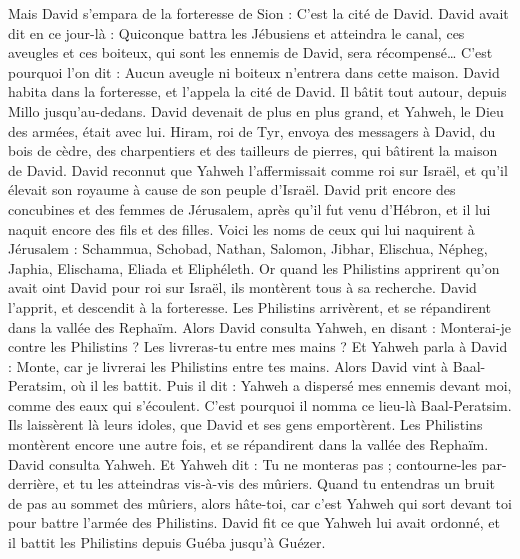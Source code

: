 \begin{multicols}{2}
Mais David s’empara de la forteresse de Sion : C’est la cité de David.
David avait dit en ce jour-là : Quiconque battra les Jébusiens et atteindra le canal, ces aveugles et ces boiteux, qui sont les ennemis de David, sera récompensé… C'est pourquoi l’on dit : Aucun aveugle ni boiteux n'entrera dans cette maison.
David habita dans la forteresse, et l'appela la cité de David. Il bâtit tout autour, depuis Millo jusqu'au-dedans.
David devenait de plus en plus grand, et Yahweh, le Dieu des armées, était avec lui.
Hiram, roi de Tyr, envoya des messagers à David, du bois de cèdre, des charpentiers et des tailleurs de pierres, qui bâtirent la maison de David.
David reconnut que Yahweh l'affermissait comme roi sur Israël, et qu'il élevait son royaume à cause de son peuple d'Israël.
David prit encore des concubines et des femmes de Jérusalem, après qu'il fut venu d'Hébron, et il lui naquit encore des fils et des filles.
Voici les noms de ceux qui lui naquirent à Jérusalem : Schammua, Schobad, Nathan, Salomon,
Jibhar, Elischua, Népheg, Japhia,
Elischama, Eliada et Eliphéleth.
Or quand les Philistins apprirent qu'on avait oint David pour roi sur Israël, ils montèrent tous à sa recherche. David l’apprit, et descendit à la forteresse.
Les Philistins arrivèrent, et se répandirent dans la vallée des Rephaïm.
Alors David consulta Yahweh, en disant : Monterai-je contre les Philistins ? Les livreras-tu entre mes mains ? Et Yahweh parla à David : Monte, car je livrerai les Philistins entre tes mains.
Alors David vint à Baal-Peratsim, où il les battit. Puis il dit : Yahweh a dispersé mes ennemis devant moi, comme des eaux qui s’écoulent. C'est pourquoi il nomma ce lieu-là Baal-Peratsim.
Ils laissèrent là leurs idoles, que David et ses gens emportèrent.
Les Philistins montèrent encore une autre fois, et se répandirent dans la vallée des Rephaïm.
David consulta Yahweh. Et Yahweh dit : Tu ne monteras pas ; contourne-les par-derrière, et tu les atteindras vis-à-vis des mûriers.
Quand tu entendras un bruit de pas au sommet des mûriers, alors hâte-toi, car c’est Yahweh qui sort devant toi pour battre l’armée des Philistins.
David fit ce que Yahweh lui avait ordonné, et il battit les Philistins depuis Guéba jusqu'à Guézer.

\end{multicols}
